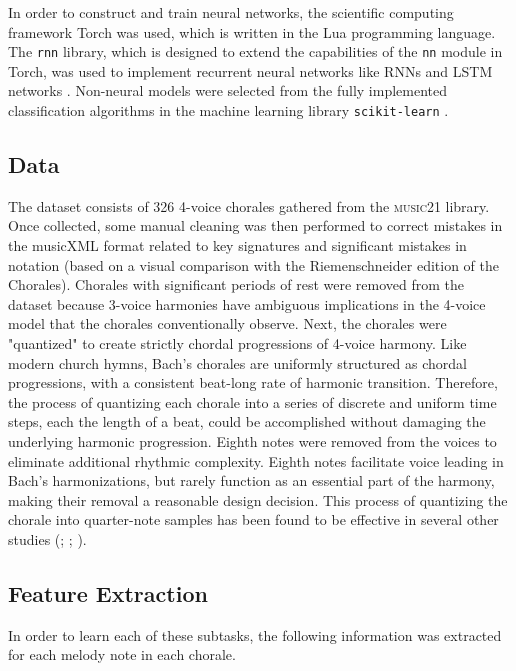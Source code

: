 \documentclass[11pt]{article}
\begin{document}
In order to construct and train neural networks, the scientific computing framework Torch was used, which is written in the Lua programming language. The \texttt{rnn} library, which is designed to extend the capabilities of the \texttt{nn} module in Torch, was used to implement recurrent neural networks like RNNs and LSTM networks \citep{leonard2015rnn}. Non-neural models were selected from the fully implemented classification algorithms in the machine learning library \texttt{scikit-learn} \citep{scikit-learn}.

\subsection{Data}

The dataset consists of 326 4-voice chorales gathered from the \textsc{music21} library. Once collected, some manual cleaning was then performed to correct mistakes in the musicXML format related to key signatures and significant mistakes in notation (based on a visual comparison with the Riemenschneider edition of the Chorales). Chorales with significant periods of rest were removed from the dataset because 3-voice harmonies have ambiguous implications in the 4-voice model that the chorales conventionally observe. Next, the chorales were "quantized" to create strictly chordal progressions of 4-voice harmony. Like modern church hymns, Bach's chorales are uniformly structured as chordal progressions, with a consistent beat-long rate of harmonic transition. Therefore, the process of quantizing each chorale into a series of discrete and uniform time steps, each the length of a beat, could be accomplished without damaging the underlying harmonic progression. Eighth notes were removed from the voices to eliminate additional rhythmic complexity. Eighth notes facilitate voice leading in Bach's harmonizations, but rarely function as an essential part of the harmony, making their removal a reasonable design decision. This process of quantizing the chorale into quarter-note samples has been found to be effective in several other studies (\cite{hild1992harmonet}; \cite{madsen2002}; \cite{kaliakatsos2014}).


\subsection{Feature Extraction}

In order to learn each of these subtasks, the following information was extracted for each melody note in each chorale.
\end{document}
